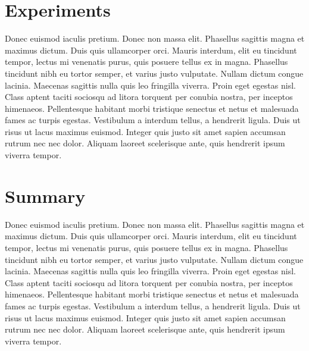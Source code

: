 \documentclass[format=acmsmall, review=false, screen=true]{acmart}
\begin{document}
\section{Experiments}

Donec euismod iaculis pretium. Donec non massa elit. Phasellus sagittis magna et maximus dictum. Duis quis ullamcorper orci. Mauris interdum, elit eu tincidunt tempor, lectus mi venenatis purus, quis posuere tellus ex in magna. Phasellus tincidunt nibh eu tortor semper, et varius justo vulputate. Nullam dictum congue lacinia. Maecenas sagittis nulla quis leo fringilla viverra. Proin eget egestas nisl. Class aptent taciti sociosqu ad litora torquent per conubia nostra, per inceptos himenaeos. Pellentesque habitant morbi tristique senectus et netus et malesuada fames ac turpis egestas. Vestibulum a interdum tellus, a hendrerit ligula. Duis ut risus ut lacus maximus euismod. Integer quis justo sit amet sapien accumsan rutrum nec nec dolor. Aliquam laoreet scelerisque ante, quis hendrerit ipsum viverra tempor.


\section{Summary}

Donec euismod iaculis pretium. Donec non massa elit. Phasellus sagittis magna et maximus dictum. Duis quis ullamcorper orci. Mauris interdum, elit eu tincidunt tempor, lectus mi venenatis purus, quis posuere tellus ex in magna. Phasellus tincidunt nibh eu tortor semper, et varius justo vulputate. Nullam dictum congue lacinia. Maecenas sagittis nulla quis leo fringilla viverra. Proin eget egestas nisl. Class aptent taciti sociosqu ad litora torquent per conubia nostra, per inceptos himenaeos. Pellentesque habitant morbi tristique senectus et netus et malesuada fames ac turpis egestas. Vestibulum a interdum tellus, a hendrerit ligula. Duis ut risus ut lacus maximus euismod. Integer quis justo sit amet sapien accumsan rutrum nec nec dolor. Aliquam laoreet scelerisque ante, quis hendrerit ipsum viverra tempor.

\medskip

\newpage


\end{document}
